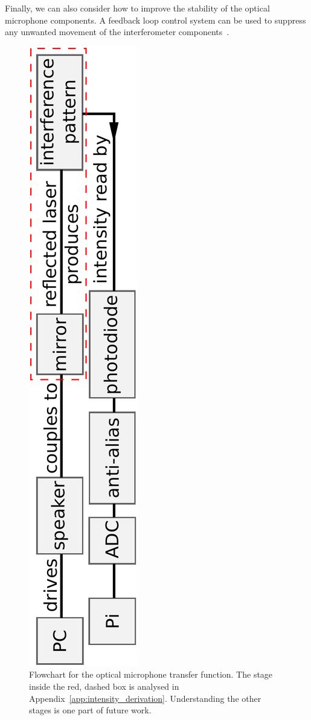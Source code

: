\documentclass[paper-main.tex]{subfiles}
\begin{document}
Finally, we can also consider how to improve the stability of the optical microphone components.
A feedback loop control system can be used to suppress any unwanted movement of the interferometer components~\citep{abbott2017exploring, Sekiguchi:2016bmv, verhoeven2009robust}. 



\begin{figure}
	\includegraphics[height=.99\textwidth, angle=-90]{figures/pipeline.pdf}
	\caption{
Flowchart for the optical microphone transfer function. 
The stage inside the red, dashed box is analysed in Appendix~\ref{app:intensity_derivation}. Understanding the other stages is one part of future work. 
}
	\label{fig:pipeline_highlighted}
\end{figure}
\end{document}
